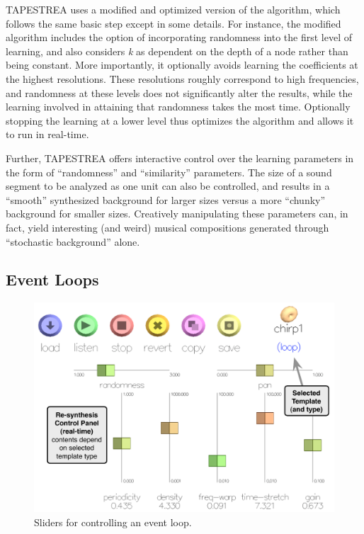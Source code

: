\documentclass[10pt,letterpaper]{article}
\begin{document}
TAPESTREA uses a modified and optimized version of the algorithm, which
follows the same basic step except in some details. For instance, the
modified algorithm includes the option of incorporating randomness into
the first level of learning, and also considers \textit{k} as dependent on
the depth of a node rather than being constant. More importantly, it
optionally avoids learning the coefficients at the highest resolutions.
These resolutions roughly correspond to high frequencies, and randomness
at these levels does not significantly alter the results, while the
learning involved in attaining that randomness takes the most time.
Optionally stopping the learning at a lower level thus optimizes the
algorithm and allows it to run in real-time. 

Further, TAPESTREA offers interactive control over the learning
parameters in the form of ``randomness'' and ``similarity'' parameters. The
size of a sound segment to be analyzed as one unit can also be
controlled, and results in a ``smooth'' synthesized background for larger
sizes versus a more ``chunky'' background for smaller sizes. Creatively
manipulating these parameters can, in fact, yield interesting (and
weird) musical compositions generated through ``stochastic background''
alone.

\subsection{Event Loops}

\begin{figure}[h]
  \begin{center}
    \includegraphics[width=.95\columnwidth]{ui_params.pdf}
    \caption{Sliders for controlling an event loop.} 
    \label{fig:ui_loop_params}
  \end{center}
\end{figure}
\end{document}
